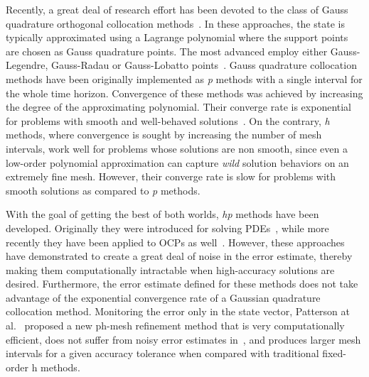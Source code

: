 Recently, a great deal of research effort has been devoted to the class of Gauss quadrature orthogonal collocation methods~\cite{Elnager:TAC:1995,Fahroo:JGCD:2002,Garg:Automatica:2010,Darby:JSR:2011,Darby:OCAM:2011}. In these approaches, the state is typically approximated using a Lagrange polynomial where the support points are chosen as Gauss quadrature points. The most advanced employ either Gauss-Legendre, Gauss-Radau or Gauss-Lobatto points~\cite{Biegler:book:2010}. Gauss quadrature collocation methods have been originally implemented as \emph{p} methods with a single interval for the whole time horizon. Convergence of these methods was achieved by increasing the degree of the approximating polynomial. Their converge rate is exponential for problems with smooth and well-behaved solutions~\cite{Canuto:book:1988,Fornberg:book:1996}. On the contrary, \emph{h} methods, where convergence is sought by increasing the number of mesh intervals, work well for problems whose solutions are non smooth, since even a low-order polynomial approximation can capture \emph{wild} solution behaviors on an extremely fine mesh. However, their converge rate is slow for problems with smooth solutions as compared to \emph{p} methods.

With the goal of getting the best of both worlds, \emph{hp} methods have been developed. Originally they were introduced for solving PDEs~\cite{Babuska:CMAME:1990}, while more recently they have been applied to OCPs as well~\cite{Darby:OCAM:2011,Darby:JSR:2011}. However, these approaches have demonstrated to create a great deal of noise in the error estimate, thereby making them computationally intractable when high-accuracy solutions are desired. Furthermore, the error estimate defined for these methods does not take advantage of the exponential convergence rate of a Gaussian quadrature collocation method.
Monitoring the error only in the state vector, Patterson at al.~\cite{Patterson:OCAM:2015} proposed a new ph-mesh refinement method that is very computationally efficient, does not suffer from noisy error estimates in~\cite{Darby:JSR:2011}, and produces larger mesh intervals for a given accuracy tolerance when compared with traditional fixed-order h methods.

